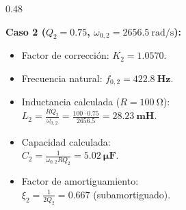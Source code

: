 \begin{frame}
\begin{columns}[t, onlytextwidth]
    \begin{column}{0.48\textwidth}
      \begin{tarjeta}[colframe=NavyDark]
        {\fontsize{9pt}{11pt}\selectfont \textbf{\color{NavyDark} Caso 2 ($Q_2 = 0.75$, $\omega_{0,2} = \qty{2656.5}{\radian\per\second}$):}}\\[2pt]
        {\fontsize{8pt}{10pt}\selectfont
        \begin{itemize}\setlength{\itemsep}{2.5pt}
          \item Factor de corrección: $K_2 = \mathbf{1.0570}$.
          \item Frecuencia natural: $f_{0,2} = \mathbf{\qty{422.8}{\hertz}}$.
          \item Inductancia calculada ($R = \qty{100}{\ohm}$):\\
          $L_2 = \frac{R Q_2}{\omega_{0,2}} = \frac{100 \cdot 0.75}{2656.5} = \mathbf{\qty{28.23}{\milli\henry}}$.
          \item Capacidad calculada:\\
          $C_2 = \frac{1}{\omega_{0,2} R Q_2} = \mathbf{\qty{5.02}{\micro\farad}}$.
          \item Factor de amortiguamiento:\\
          $\xi_2 = \frac{1}{2 Q_2} = \mathbf{0.667}$ (subamortiguado).
        \end{itemize}
        }
      \end{tarjeta}
    \end{column}
  \end{columns}
\end{frame}


